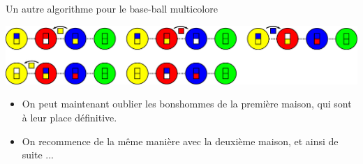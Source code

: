 \begin{frame}{Un autre algorithme pour le base-ball multicolore}
  \begin{center}
    \includegraphics[width=0.8\linewidth]{img/baseball_ex3.pdf}
  \end{center}

  \begin{itemize}
  \item On peut maintenant oublier les bonshommes de la première maison, qui sont à leur place définitive.
  \item On recommence de la même manière avec la deuxième maison, et ainsi de suite ...
  \end{itemize}
\end{frame}




